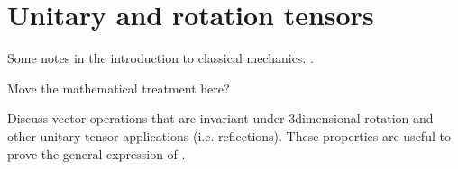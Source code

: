 \documentclass[letterpaper,10pt,english]{jupyterBook}
\begin{document}
\sphinxstepscope


\chapter{Unitary and rotation tensors}
\label{\detokenize{ch/tensor-algebra-calculus/algebra-rotation-tensors:unitary-and-rotation-tensors}}\label{\detokenize{ch/tensor-algebra-calculus/algebra-rotation-tensors:tensor-algebra-unitary-tensors}}\label{\detokenize{ch/tensor-algebra-calculus/algebra-rotation-tensors::doc}}
\sphinxAtStartPar
Some notes in the introduction to classical mechanics: .

\sphinxAtStartPar
{} Move the mathematical treatment here?

\sphinxAtStartPar
{} Discuss vector operations that are invariant under 3\sphinxhyphen{}dimensional rotation and other unitary tensor applications (i.e. reflections). These properties are useful to prove the general expression of {\hyperref[\detokenize{ch/tensor-algebra-calculus/algebra-isotropic-tensors:tensor-algebra-isotropic-tensors}]{}}.
\end{document}
